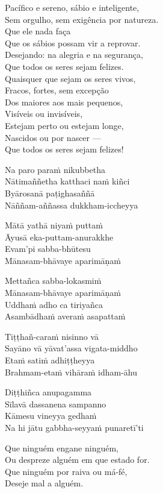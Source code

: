 Pacífico e sereno, sábio e inteligente,\\
Sem orgulho, sem exigência por natureza.\\
Que ele nada faça\\
Que os sábios possam vir a reprovar.\\
Desejando: na alegria e na segurança,\\
Que todos os seres sejam felizes.\\
Quaisquer que sejam os seres vivos,\\
Fracos, fortes, sem excepção\\
Dos maiores aos mais pequenos,\\
Visíveis ou invisíveis,\\
Estejam perto ou estejam longe,\\
Nascidos ou por nascer ---\\
Que todos os seres sejam felizes!

\clearpage

Na paro paraṁ nikubbetha\\
Nātimaññetha katthaci naṁ kiñci\\
Byārosanā paṭighasaññā\\
Nāññam-aññassa dukkham-iccheyya

Mātā yathā niyaṁ puttaṁ\\
Āyusā eka-puttam-anurakkhe\\
Evam'pi sabba-bhūtesu\\
Mānasam-bhāvaye aparimāṇaṁ

Mettañca sabba-lokasmiṁ\\
Mānasam-bhāvaye aparimāṇaṁ\\
Uddhaṁ adho ca tiriyañca\\
Asambādhaṁ averaṁ asapattaṁ

Tiṭṭhañ-caraṁ nisinno vā\\
Sayāno vā yāvat'assa vigata-middho\\
Etaṁ satiṁ adhiṭṭheyya\\
Brahmam-etaṁ vihāraṁ idham-āhu

Diṭṭhiñca anupagamma\\
Sīlavā dassanena sampanno\\
Kāmesu vineyya gedhaṁ\\
Na hi jātu gabbha-seyyaṁ punaretī'ti

\clearpage

Que ninguém engane ninguém,\\
Ou despreze alguém em que estado for.\\
Que ninguém por raiva ou má-fé,\\
Deseje mal a alguém.

